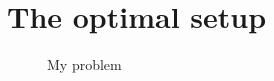 \chapter{The optimal setup}\label{cha:the-optimal-setup}


\begin{figure}[!htbp]
  \centering
  \def\svgwidth{0.9\textwidth}
  
  \caption{My problem}
\end{figure}


